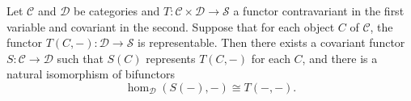 Let $\mathcal{C}$ and $\mathcal{D}$ be categories and $T : \mathcal{C} \times \mathcal{D} \to \mathcal{S}$ a functor contravariant in the first variable and covariant in the second. Suppose that for each object $C$ of $\mathcal{C}$, the functor $T(C, -) : \mathcal{D} \to \mathcal{S}$ is representable. Then there exists a covariant functor $S : \mathcal{C} \to \mathcal{D}$ such that $S(C)$ represents $T(C, -)$ for each $C$, and there is a natural isomorphism of bifunctors
\[
\hom_{\mathcal{D}}(S(-), -) \cong T(-, -).
\]
